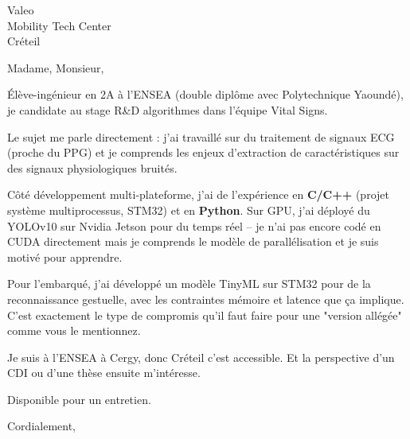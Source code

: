 \documentclass[11pt,a4paper]{letter}
\begin{document}
\begin{letter}{Valeo\\
Mobility Tech Center\\
Créteil}

\opening{Madame, Monsieur,}

Élève-ingénieur en 2A à l'ENSEA (double diplôme avec Polytechnique Yaoundé), je candidate au stage R\&D algorithmes dans l'équipe Vital Signs.

Le sujet me parle directement : j'ai travaillé sur du traitement de signaux ECG (proche du PPG) et je comprends les enjeux d'extraction de caractéristiques sur des signaux physiologiques bruités.

Côté développement multi-plateforme, j'ai de l'expérience en \textbf{C/C++} (projet système multiprocessus, STM32) et en \textbf{Python}. Sur GPU, j'ai déployé du YOLOv10 sur Nvidia Jetson pour du temps réel -- je n'ai pas encore codé en CUDA directement mais je comprends le modèle de parallélisation et je suis motivé pour apprendre.

Pour l'embarqué, j'ai développé un modèle TinyML sur STM32 pour de la reconnaissance gestuelle, avec les contraintes mémoire et latence que ça implique. C'est exactement le type de compromis qu'il faut faire pour une "version allégée" comme vous le mentionnez.

Je suis à l'ENSEA à Cergy, donc Créteil c'est accessible. Et la perspective d'un CDI ou d'une thèse ensuite m'intéresse.

Disponible pour un entretien.

\closing{Cordialement,}

\end{letter}
\end{document}
